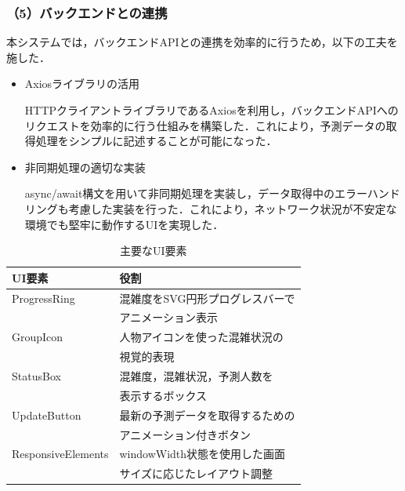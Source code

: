 \subsubsection*{（5）バックエンドとの連携}
本システムでは，バックエンドAPIとの連携を効率的に行うため，以下の工夫を施した．

\begin{itemize}
	\item Axiosライブラリの活用
	
	HTTPクライアントライブラリであるAxiosを利用し，バックエンドAPIへのリクエストを効率的に行う仕組みを構築した．これにより，予測データの取得処理をシンプルに記述することが可能になった．
	
	\item 非同期処理の適切な実装
	
	async/await構文を用いて非同期処理を実装し，データ取得中のエラーハンドリングも考慮した実装を行った．これにより，ネットワーク状況が不安定な環境でも堅牢に動作するUIを実現した．
\end{itemize}

\begin{table}[tb]
	\centering
	\caption{主要なUI要素}
	\label{tbl:UI_components}
	\small
	\setlength{\tabcolsep}{4pt}
	\doublerulesep=0.3pt
	\begin{tabular}{l|p{5cm}} \hline\hline\hline
		UI要素 & 役割 \\ \hline
		ProgressRing & 混雑度をSVG円形プログレスバーで\\
		&アニメーション表示 \\ \hline
		GroupIcon & 人物アイコンを使った混雑状況の\\
		&視覚的表現 \\ \hline
		StatusBox & 混雑度，混雑状況，予測人数を\\
		&表示するボックス \\ \hline
		UpdateButton & 最新の予測データを取得するための\\
		&アニメーション付きボタン \\ \hline
		ResponsiveElements & windowWidth状態を使用した画面\\
		&サイズに応じたレイアウト調整 \\ \hline\hline\hline
	\end{tabular}
\end{table}

